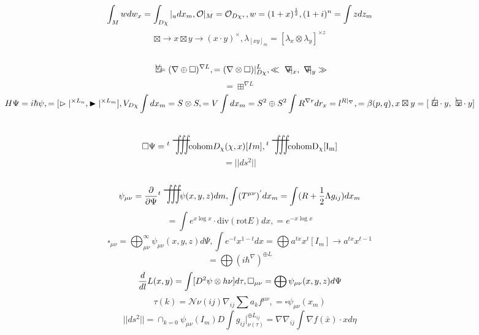 \documentclass{jsarticle}
\begin{document}
  $$\int_M w dw_x = \int_{D\chi}|_u dx_m, 
   \mathcal{O}|_M = \mathcal{O}_{D\chi},, 
   w = (1 + x)^{1 \over 2}, 
   (1 + i)^n = \int z dz_m $$
  $$ \boxtimes \to x \boxtimes y \to (x \cdot y)^{\times}, 
   \lambda_{[xy]_m} = [\lambda_x \otimes \lambda_y]^{\times z} $$

  $$ \letter = (\nabla \oplus \square)^{\nabla L}, 
   = (\nabla \otimes \square)|^{L}_{D\chi}, 
   \ll \secproduct|_x, \secproduct|_y \gg $$
  $$ = \boxplus^{\nabla L} $$
  $$ H\Psi = i \hbar \psi, 
   = [\vartriangleright|^{\times L_n}, 
  \blacktriangleright|^{\times L_m}], 
   V_{D\chi}\int dx_m = S \otimes S, 
   = V\int dx_m = S^2 \oplus S^2 
   \int R^{\nabla r}dr_x = l^{R|_{\nabla}}, 
   = \beta(p,q), 
   x \boxtimes y = [\average x\cdot y, \averagesqrt x \cdot y] $$ 

 
	 $$ \square \Psi = {}^{t}\scalebox{1}[2]{\variiint}
	 \mathrm{cohom}D_{\chi}(\chi,x)[Im], 
  {}^{t}\scalebox{1}[2]{\variiint}\mathrm{cohom D_{\chi}[I_m]} $$
$$ = ||ds^2|| $$
$$ \mathcal{\psi}_{\mu\nu} = {\partial \over {\partial \Psi}} {}^{t}
 \scalebox{1}[2]{\variiint} \mathcal{\psi}(x,y,z)dm, 
  \int (T^{\mu\nu})^{'}dx_m = \int (R + {1 \over 2}\Lambda g_{ij})dx_m $$
 $$ = \int e^{x\log x}\cdot \mathrm{div}(\mathrm{rot} E)dx, 
  = e^{-x \log x} $$
 $$ \square_{\mu\nu} = \bigoplus^{\infty}_{\mu\nu} \mathcal{\psi}_{\mu\nu}
 (x,y,z)d\Psi, 
  \int e^{-t}x^{1 - t}dx = \bigoplus a^{tx}x^{t}[I_m] \to a^{tx}x^{t -1} $$
 $$ = \bigoplus {(i \hbar^{\nabla})}^{\oplus L} $$
 $$ {d \over {d l}}L(x,y) = \int [D^2 \psi \otimes h\nu]d \tau, 
  \square_{\mu\nu} = \bigoplus \mathcal{\psi}_{\mu\nu}(x,y,z)d\Psi $$
 $$ \tau(k) = \mathcal{N}\nu(ij) \nabla_{ij}\sum a_k f^{\mu\nu}, 
  = \square \mathcal{\psi}_{\mu\nu}(x_m) $$
 $$ ||ds^2|| = \cap_{k=0}\mathcal{\psi}_{\mu\nu}(I_m) 
  D\int g_{ij}|^{\oplus L_{ij}}_{\nu(\tau)} = \nabla \nabla_{ij}\int 
 \nabla f(\bar{x})\cdot x d\eta $$
 
 
\end{document}
